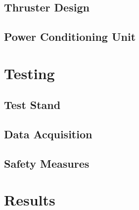 \documentclass[journal]{IEEEtran}
\begin{document}
\subsection{Thruster Design}

\subsection{Power Conditioning Unit}

\section{Testing}

\subsection{Test Stand}

\subsection{Data Acquisition}

\subsection{Safety Measures}

\section{Results}
\end{document}
